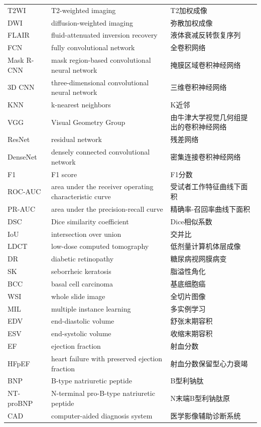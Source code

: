 \begin{center}
\begin{longtable}{p{}p{}p{}}
T2WI & T2-weighted imaging & T2加权成像\\
DWI & diffusion-weighted imaging & 弥散加权成像\\
FLAIR & fluid-attenuated inversion recovery & 液体衰减反转恢复序列\\
FCN & fully convolutional network & 全卷积网络\\
Mask R-CNN & mask region-based convolutional neural network & 掩膜区域卷积神经网络\\
3D CNN & three-dimensional convolutional neural network & 三维卷积神经网络\\
KNN & k-nearest neighbors & K近邻\\
VGG & Visual Geometry Group & 由牛津大学视觉几何组提出的卷积神经网络\\
ResNet & residual network & 残差网络\\
DenseNet & densely connected convolutional network & 密集连接卷积神经网络\\
F1 & F1 score & F1分数\\
ROC-AUC & area under the receiver operating characteristic curve & 受试者工作特征曲线下面积\\
PR-AUC & area under the precision-recall curve & 精确率-召回率曲线下面积\\
DSC & Dice similarity coefficient & Dice相似系数\\
IoU & intersection over union & 交并比\\
LDCT & low-dose computed tomography & 低剂量计算机体层成像\\
DR & diabetic retinopathy & 糖尿病视网膜病变\\
SK & seborrheic keratosis & 脂溢性角化\\
BCC & basal cell carcinoma & 基底细胞癌\\
WSI & whole slide image & 全切片图像\\
MIL & multiple instance learning & 多实例学习\\
EDV & end-diastolic volume & 舒张末期容积\\
ESV & end-systolic volume & 收缩末期容积\\
EF & ejection fraction & 射血分数\\
HFpEF & heart failure with preserved ejection fraction & 射血分数保留型心力衰竭\\
BNP & B-type natriuretic peptide & B型利钠肽\\
NT-proBNP & N-terminal pro-B-type natriuretic peptide & N末端B型利钠肽原\\
CAD & computer-aided diagnosis system & 医学影像辅助诊断系统\\

\end{longtable}
\end{center}
